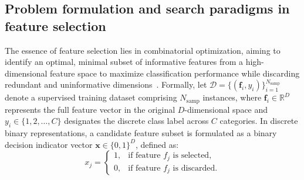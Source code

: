 \subsection{Problem formulation and search paradigms in feature selection}\label{sec:problem_formulation}

The essence of feature selection lies in combinatorial optimization, aiming to identify an optimal, minimal subset of informative features from a high-dimensional feature space to maximize classification performance while discarding redundant and uninformative dimensions~\cite{guyon2003,lili2017}. Formally, let $\mathcal{D} = \{(\mathbf{f}_i, y_i)\}_{i=1}^{N_{\mathrm{samp}}}$ denote a supervised training dataset comprising $N_{\mathrm{samp}}$ instances, where $\mathbf{f}_i \in \mathbb{R}^D$ represents the full feature vector in the original $D$-dimensional space and $y_i \in \{1, 2, \ldots, C\}$ designates the discrete class label across $C$ categories. In discrete binary representations, a candidate feature subset is formulated as a binary decision indicator vector $\mathbf{x} \in \{0, 1\}^D$, defined as:
\begin{equation}
x_j = \begin{cases}
1, & \text{if feature } f_j \text{ is selected}, \\[2pt]
0, & \text{if feature } f_j \text{ is discarded}.
\end{cases}
\label{eq:binary_decision}
\end{equation}


